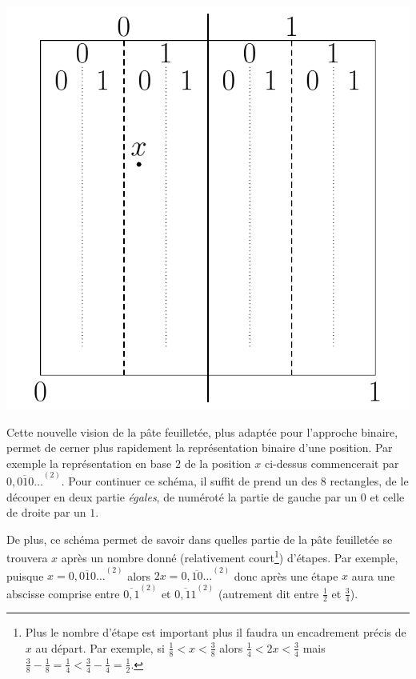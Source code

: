 \documentclass[a4paper,french,12pt]{article}
\begin{document}
\begin{center}
\includegraphics[scale=0.45]{../TeXGraph/Pdf/visuel_2D_pate_binaire.pdf}
\end{center}

Cette nouvelle vision de la pâte feuilletée, plus adaptée pour l'approche binaire, permet de cerner plus rapidement la représentation binaire d'une position. Par exemple la représentation en base $2$ de la position $x$ ci-dessus commencerait par $\overline{0{,}010\ldots}^{\left(2\right)}$. Pour continuer ce schéma, il suffit de prend un des $8$ rectangles, de le découper en deux partie \emph{égales}, de numéroté la partie de gauche par un $0$ et celle de droite par un $1$.

De plus, ce schéma permet de savoir dans quelles partie de la pâte feuilletée se trouvera $x$ après un nombre donné (relativement court\footnote{Plus le nombre d'étape est important plus il faudra un encadrement précis de $x$ au départ. Par exemple, si $\frac{1}{8}<x<\frac{3}{8}$ alors $\frac{1}{4}<2x<\frac{3}{4}$ mais $\frac{3}{8}-\frac{1}{8}=\frac{1}{4}<\frac{3}{4}-\frac{1}{4}=\frac{1}{2}$.}) d'étapes. Par exemple, puisque $x=\overline{0{,}010\ldots}^{\left(2\right)}$ alors $2x=\overline{0{,}10\ldots}^{\left(2\right)}$ donc après une étape $x$ aura une abscisse comprise entre $\overline{0{,}1}^{\left(2\right)}$ et $\overline{0{,}11}^{\left(2\right)}$ (autrement dit entre $\frac{1}{2}$ et $\frac{3}{4}$).
\end{document}

